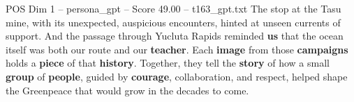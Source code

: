 \begin{textsample}{POS Dim 1 – persona\_gpt – Score 49.00 – t163\_gpt.txt}
The stop at the Tasu mine, with its unexpected, auspicious encounters, hinted at unseen currents of support.
And the passage through Yucluta Rapids reminded \textbf{us} that the ocean itself was both our route and our \textbf{teacher}.
Each \textbf{image} from those \textbf{campaigns} holds a \textbf{piece} of that \textbf{history}.
Together, they tell the \textbf{story} of how a small \textbf{group} of \textbf{people}, guided by \textbf{courage}, collaboration, and respect, helped shape the Greenpeace that would grow in the decades to come.

\end{textsample}

